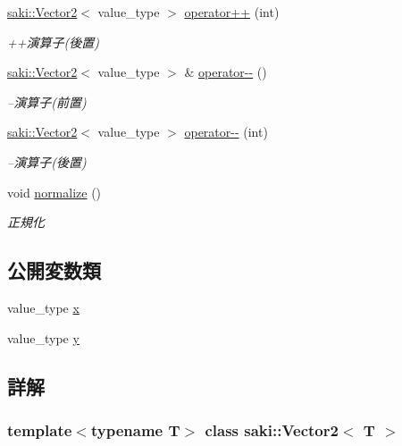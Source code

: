\begin{DoxyCompactItemize}
\mbox{\hyperlink{classsaki_1_1_vector2}{saki\+::\+Vector2}}$<$ value\+\_\+type $>$ \mbox{\hyperlink{classsaki_1_1_vector2_a1736752293670457513e7e8e8354e5f8}{operator++}} (int)
\begin{DoxyCompactList}\small\item\em ++演算子(後置) \end{DoxyCompactList}\item 
\mbox{\hyperlink{classsaki_1_1_vector2}{saki\+::\+Vector2}}$<$ value\+\_\+type $>$ \& \mbox{\hyperlink{classsaki_1_1_vector2_a893f021366238f8b1c45da7ae558dd5c}{operator-\/-\/}} ()
\begin{DoxyCompactList}\small\item\em --演算子(前置) \end{DoxyCompactList}\item 
\mbox{\hyperlink{classsaki_1_1_vector2}{saki\+::\+Vector2}}$<$ value\+\_\+type $>$ \mbox{\hyperlink{classsaki_1_1_vector2_ac53f3abd663c5f4c7d4f76a1ad778fbd}{operator-\/-\/}} (int)
\begin{DoxyCompactList}\small\item\em --演算子(後置) \end{DoxyCompactList}\item 
void \mbox{\hyperlink{classsaki_1_1_vector2_a8267f8608ffad9796813856c05076d8c}{normalize}} ()
\begin{DoxyCompactList}\small\item\em 正規化 \end{DoxyCompactList}\end{DoxyCompactItemize}
\subsection*{公開変数類}
\begin{DoxyCompactItemize}
\item 
value\+\_\+type \mbox{\hyperlink{classsaki_1_1_vector2_a49033472256ec3e82f70e429175e08e4}{x}}
\item 
value\+\_\+type \mbox{\hyperlink{classsaki_1_1_vector2_a405e46e838ba0e6ebbe8aadd204c53da}{y}}
\end{DoxyCompactItemize}


\subsection{詳解}
\subsubsection*{template$<$typename T$>$\newline
class saki\+::\+Vector2$<$ T $>$}


